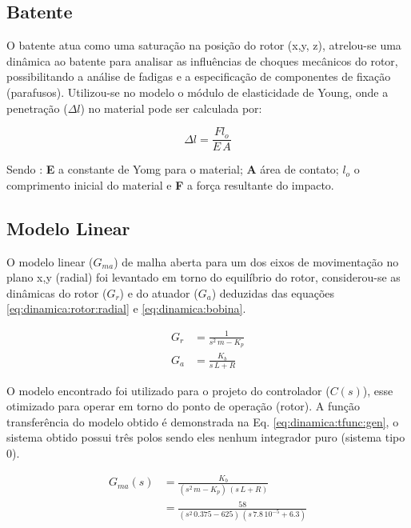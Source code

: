 \subsection{Batente}

O batente atua como uma saturação na posição do rotor (x,y, z), atrelou-se uma dinâmica ao batente para analisar as influências de choques mecânicos do rotor, possibilitando a análise de fadigas e a especificação de componentes de fixação (parafusos). Utilizou-se no  modelo o módulo de elasticidade de Young, onde a penetração ($\Delta l $) no material pode ser calculada por:

\begin{equation}
	\Delta l =  \frac{F l_o}{E \, A}
\end{equation}

Sendo : \textbf{E }a constante de Yomg para o material; \textbf{A} área de contato; \textbf{$l_o$ } o comprimento inicial do material e \textbf{F} a força resultante do impacto. 


\subsection{Modelo Linear}

O modelo linear ($G_{ma}$) de malha aberta para um dos eixos de movimentação no plano x,y (radial) foi levantado em torno do equilíbrio do rotor, considerou-se as dinâmicas do rotor ($G_r$) e do atuador ($G_a$) deduzidas das equações  \eqref{eq:dinamica:rotor:radial} e \eqref{eq:dinamica:bobina}.

\begin{align}
	G_r &= \frac{1}{s^2 \, m - K_p} \\
	G_a &= \frac{K_b}{s\, L + R}
\end{align}

O modelo encontrado foi utilizado para o projeto do controlador ($C(s)$), esse otimizado para operar em torno do ponto de operação (rotor). A função transferência do modelo obtido é demonstrada na Eq. \eqref{eq:dinamica:tfunc:gen}, o sistema obtido possui três polos sendo eles nenhum integrador puro (sistema tipo 0).  

\begin{align}
	G_{ma}(s) &= \frac{K_b}{(s^2 \, m - K_p) \, (s\, L + R)}	\label{eq:dinamica:tfunc:gen} \\
	&= \frac{58}{(s^2 \, 0.375 - 625) \, (s\, 7.8 \, 10^{-5} + 6.3)}
	 \label{eq:dinamica:tfunc}
\end{align}
 

